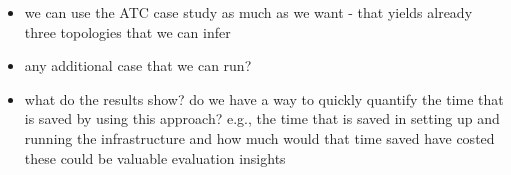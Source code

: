 \begin{itemize}
\item we can use the ATC case study as much as we want - that yields already three topologies that we can infer
\item any additional case that we can run?
\item what do the results show? do we have a way to quickly quantify the time that is saved by using this approach? e.g., the time that is saved in setting up and running the infrastructure and how much would that time saved have costed these could be valuable evaluation insights
\end{itemize}